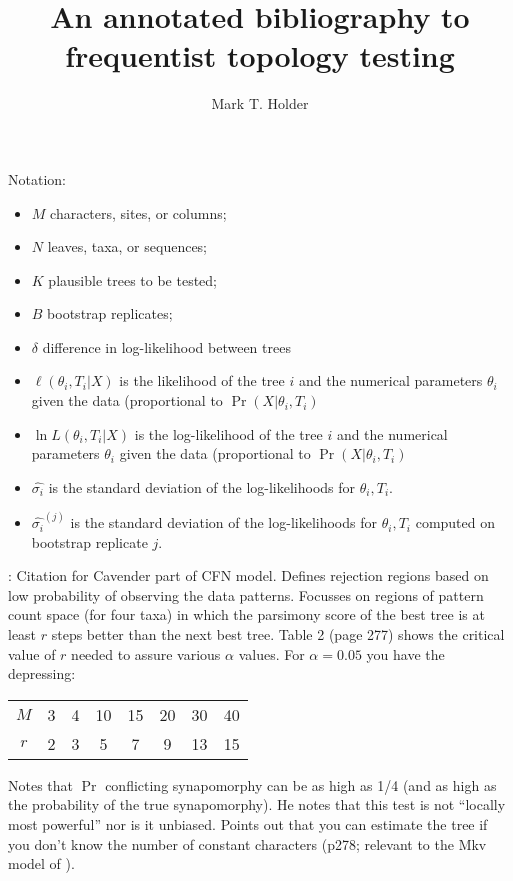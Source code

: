\documentclass[11pt]{article}
\title{An annotated bibliography to frequentist topology testing}
\author{Mark T. Holder}
\newcommand{\sdLL}[1]{\hat{\sigma_{#1}}}
\newcommand{\sdLLBoot}[2]{\hat{\sigma_{#1}}^{(#2)}}
\newcommand{\like}{\ell}
\begin{document}
\maketitle

Notation:
\begin{itemize}
	\item $M$ characters, sites, or columns;
	\item $N$ leaves, taxa, or sequences;
	\item $K$ plausible trees to be tested;
	\item $B$ bootstrap replicates;
	\item $\delta$ difference in log-likelihood between trees
	\item $\like(\theta_i,T_i|X)$ is the likelihood of the tree $i$ and the numerical parameters $\theta_i$ given the data (proportional to $\Pr(X|\theta_i,T_i)$
	\item $\ln L(\theta_i,T_i|X)$ is the log-likelihood of the tree $i$ and the numerical parameters $\theta_i$ given the data (proportional to $\Pr(X|\theta_i,T_i)$
	\item $\sdLL{i}$ is the standard deviation of the log-likelihoods for $\theta_i,T_i$.
	\item $\sdLLBoot{i}{j}$ is the standard deviation of the log-likelihoods for $\theta_i,T_i$ computed on bootstrap replicate $j$.
\end{itemize}
	

\citet{Cavender1978}:  Citation for Cavender part of CFN model.  Defines rejection regions based on low probability of observing the data patterns.  Focusses on regions of pattern count space (for four taxa) in which the parsimony score of the best tree is at least $r$ steps better than the next best tree.  Table 2 (page 277) shows the critical value of $r$ needed to assure various $\alpha$ values.  For $\alpha= 0.05$ you have the depressing:
\begin{center}
\begin{tabular}{cccccccc}
$M$ & 3 & 4 & 10 & 15 & 20 & 30 & 40 \\
$r$ & 2 & 3 & 5 & 7 & 9 & 13 & 15 
\end{tabular}
\end{center}
Notes that $\Pr$ conflicting synapomorphy can be as high as 1/4 (and as high as the probability of the true synapomorphy).  He notes that this test is not ``locally most powerful'' nor is it unbiased. Points out that you can estimate the tree if you don't know the number of constant characters (p278; relevant to the Mkv model of \citep{Lewis2001}).
\end{document}

